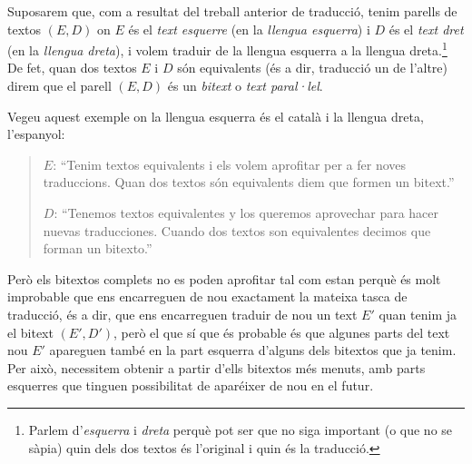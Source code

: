 Suposarem que, com a resultat del treball anterior de traducció, tenim
parells de textos $(E,D)$ on $E$ és el \emph{text esquerre} (en la
\emph{llengua esquerra}) i $D$ és el \emph{text dret} (en la
\emph{llengua dreta}), i volem traduir de la llengua esquerra a la
llengua dreta.\footnote{Parlem d'\emph{esquerra} i \emph{dreta} perquè
  pot ser que no siga important (o que no se sàpia) quin dels dos
  textos és l'original i quin és la traducció.}  De fet, quan dos
textos $E$ i $D$ són equivalents (és a dir, traducció un de l'altre)
direm que el parell $(E,D)$ és un \emph{bitext} o \emph{text
  paral·lel}.

Vegeu aquest exemple on la llengua esquerra és el català i la llengua
dreta, l'espanyol:
\begin{quote}
  $E$: ``Tenim textos equivalents i els volem aprofitar per a fer
  noves traduccions. Quan dos textos són equivalents diem que formen
  un bitext.''

  $D$: ``Tenemos textos equivalentes y los queremos aprovechar para
  hacer nuevas traducciones. Cuando dos textos son equivalentes
  decimos que forman un bitexto.''
\end{quote}

Però els bitextos complets no es poden aprofitar tal com estan perquè
és molt improbable que ens encarreguen de nou exactament la mateixa
tasca de traducció, és a dir, que ens encarreguen traduir de nou un
text $E'$ quan tenim ja el bitext $(E',D')$, però el que sí que és
probable és que algunes parts del text nou $E'$ apareguen també en la
part esquerra d'alguns dels bitextos que ja tenim. Per això,
necessitem obtenir a partir d'ells bitextos més menuts, amb parts esquerres que tinguen possibilitat de aparéixer de nou en el futur.

